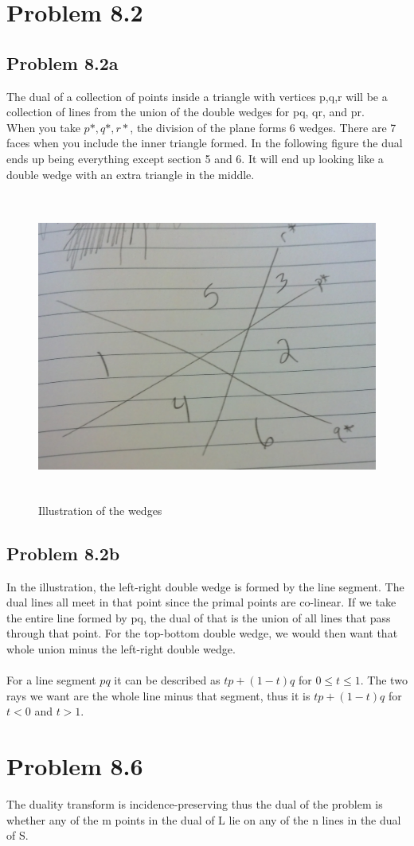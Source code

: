 \documentclass[11pt,psfig]{article}
\begin{document}
\section*{Problem 8.2}

\subsection*{Problem 8.2a}

The dual of a collection of points inside a triangle with vertices p,q,r will be a collection of lines from the union of the double wedges for pq, qr, and pr. 
\\
When you take $p*, q*, r*$, the division of the plane forms 6 wedges. There are 7 faces when you include the inner triangle formed. In the following figure the dual ends up being everything except section 5 and 6. It will end up looking like a double wedge with an extra triangle in the middle. 

\begin{figure}[H]
\centering
\includegraphics[height=4in]{cs266dual.jpg}
\caption{Illustration of the wedges}
\end{figure}

\subsection*{Problem 8.2b}

In the illustration, the left-right double wedge is formed by the line segment. The dual lines all meet in that point since the primal points are co-linear. If we take the entire line formed by pq, the dual of that is the union of all lines that pass through that point. For the top-bottom double wedge, we would then want that whole union minus the left-right double wedge. \\
\\
For a line segment $pq$ it can be described as ${tp + (1-t)q}$ for $0 \leq t \leq 1$. The two rays we want are the whole line minus that segment, thus it is ${tp + (1-t)q}$ for $t < 0$ and $t > 1$. 

\section*{Problem 8.6}

The duality transform is incidence-preserving thus the dual of the problem is whether any of the m points in the dual of L lie on any of the n lines in the dual of S. 
\end{document}
